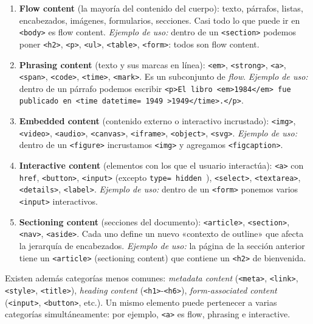 \begin{enumerate}
\item \textbf{Flow content} (la mayoría del contenido del cuerpo):
texto, párrafos, listas, encabezados, imágenes, formularios,
secciones. Casi todo lo que puede ir en \texttt{<body>} es flow
content. \emph{Ejemplo de uso:} dentro de un \texttt{<section>}
podemos poner \texttt{<h2>}, \texttt{<p>}, \texttt{<ul>},
\texttt{<table>}, \texttt{<form>}: todos son flow content.

\item \textbf{Phrasing content} (texto y sus marcas en línea):
\texttt{<em>}, \texttt{<strong>}, \texttt{<a>}, \texttt{<span>},
\texttt{<code>}, \texttt{<time>}, \texttt{<mark>}. Es un subconjunto
de \emph{flow}. \emph{Ejemplo de uso:} dentro de un párrafo podemos
escribir \texttt{<p>El libro <em>1984</em> fue publicado en
<time datetime= 1949 >1949</time>.</p>}.

\item \textbf{Embedded content} (contenido externo o interactivo
incrustado): \texttt{<img>}, \texttt{<video>}, \texttt{<audio>},
\texttt{<canvas>}, \texttt{<iframe>}, \texttt{<object>},
\texttt{<svg>}. \emph{Ejemplo de uso:} dentro de un \texttt{<figure>}
incrustamos \texttt{<img>} y agregamos \texttt{<figcaption>}.

\item \textbf{Interactive content} (elementos con los que el usuario
interactúa): \texttt{<a>} con \texttt{href}, \texttt{<button>},
\texttt{<input>} (excepto \texttt{type= hidden }), \texttt{<select>},
\texttt{<textarea>}, \texttt{<details>}, \texttt{<label>}.
\emph{Ejemplo de uso:} dentro de un \texttt{<form>} ponemos
varios \texttt{<input>} interactivos.

\item \textbf{Sectioning content} (secciones del documento):
\texttt{<article>}, \texttt{<section>}, \texttt{<nav>},
\texttt{<aside>}. Cada uno define un nuevo «contexto de outline» que
afecta la jerarquía de encabezados. \emph{Ejemplo de uso:} la
página de la sección anterior tiene un \texttt{<article>} (sectioning
content) que contiene un \texttt{<h2>} de bienvenida.
\end{enumerate}

Existen además categorías menos comunes: \emph{metadata content}
(\texttt{<meta>}, \texttt{<link>}, \texttt{<style>}, \texttt{<title>}),
\emph{heading content} (\texttt{<h1>}-\texttt{<h6>}), \emph{form-associated
content} (\texttt{<input>}, \texttt{<button>}, etc.). Un mismo
elemento puede pertenecer a varias categorías simultáneamente: por
ejemplo, \texttt{<a>} es flow, phrasing e interactive.

